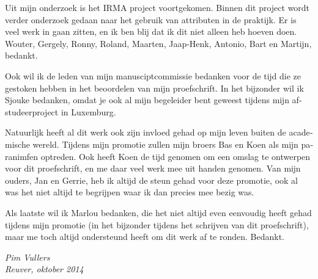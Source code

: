 \begin{otherlanguage}{dutch}
Uit mijn onderzoek is het IRMA project voortgekomen. Binnen dit project wordt
verder onderzoek gedaan naar het gebruik van attributen in de praktijk. Er is 
veel werk in gaan zitten, en ik ben blij dat ik dit niet alleen heb hoeven doen.
Wouter, Gergely, Ronny, Roland, Maarten, Jaap-Henk, Antonio, Bart en Martijn, 
bedankt.

Ook wil ik de leden van mijn manusciptcommissie bedanken voor de tijd die ze 
gestoken hebben in het beoordelen van mijn proefschrift. In het bijzonder wil 
ik Sjouke bedanken, omdat je ook al mijn begeleider bent geweest tijdens mijn 
afstudeerproject in Luxemburg.

Natuurlijk heeft al dit werk ook zijn invloed gehad op mijn leven buiten de 
academische wereld. Tijdens mijn promotie zullen mijn broers Bas en Koen als 
mijn paranimfen optreden. Ook heeft Koen de tijd genomen om een omslag te 
ontwerpen voor dit proefschrift, en me daar veel werk mee uit handen genomen. 
Van mijn ouders, Jan en Gerrie, heb ik altijd de steun gehad voor deze promotie,
ook al was het niet altijd te begrijpen waar ik dan precies mee bezig was. 

Als laatste wil ik Marlou bedanken, die het niet altijd even eenvoudig heeft 
gehad tijdens mijn promotie (in het bijzonder tijdens het schrijven van dit 
proefschrift), maar me toch altijd ondersteund heeft om dit werk af te ronden. 
Bedankt.

\begin{flushright}\it
  Pim Vullers \\
  Reuver, oktober 2014
\end{flushright}

\end{otherlanguage}

\cleardoublepage
